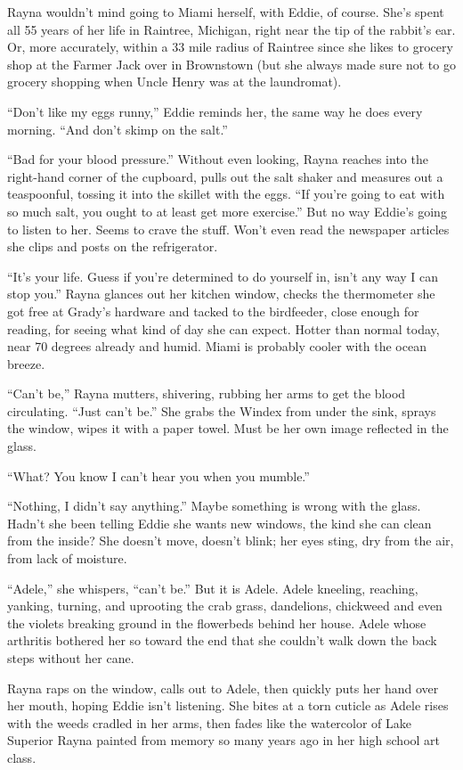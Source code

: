 \documentclass[twoside,10pt]{book}
\begin{document}
Rayna wouldn't mind going to Miami herself, with Eddie, of course. She's
spent all 55 years of her life in Raintree, Michigan, right near the tip
of the rabbit's ear. Or, more accurately, within a 33 mile radius of
Raintree since she likes to grocery shop at the Farmer Jack over in
Brownstown (but she always made sure not to go grocery shopping when
Uncle Henry was at the laundromat).

``Don't like my eggs runny,'' Eddie reminds her, the same way he does
every morning. ``And don't skimp on the salt.''

``Bad for your blood pressure.'' Without even looking, Rayna reaches
into the right-hand corner of the cupboard, pulls out the salt shaker
and measures out a teaspoonful, tossing it into the skillet with the
eggs. ``If you're going to eat with so much salt, you ought to at least
get more exercise.'' But no way Eddie's going to listen to her. Seems to
crave the stuff. Won't even read the newspaper articles she clips and
posts on the refrigerator.

``It's your life. Guess if you're determined to do yourself in, isn't
any way I can stop you.'' Rayna glances out her kitchen window, checks
the thermometer she got free at Grady's hardware and tacked to the
birdfeeder, close enough for reading, for seeing what kind of day she
can expect. Hotter than normal today, near 70 degrees already and humid.
Miami is probably cooler with the ocean breeze.

``Can't be,'' Rayna mutters, shivering, rubbing her arms to get the
blood circulating. ``Just can't be.'' She grabs the Windex from under
the sink, sprays the window, wipes it with a paper towel. Must be her
own image reflected in the glass.

``What? You know I can't hear you when you mumble.''

``Nothing, I didn't say anything.'' Maybe something is wrong with the
glass. Hadn't she been telling Eddie she wants new windows, the kind she
can clean from the inside? She doesn't move, doesn't blink; her eyes
sting, dry from the air, from lack of moisture.

``Adele,'' she whispers, ``can't be.'' But it is Adele. Adele kneeling,
reaching, yanking, turning, and uprooting the crab grass, dandelions,
chickweed and even the violets breaking ground in the flower­beds behind
her house. Adele whose arthritis bothered her so toward the end that she
couldn't walk down the back steps without her cane.

Rayna raps on the window, calls out to Adele, then quickly puts her hand
over her mouth, hoping Eddie isn't listening. She bites at a torn
cuticle as Adele rises with the weeds cradled in her arms, then fades
like the watercolor of Lake Superior Rayna painted from memory so many
years ago in her high school art class.
\end{document}
